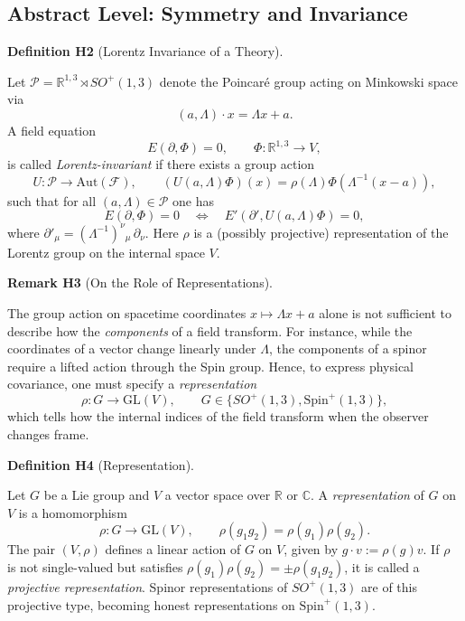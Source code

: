 \documentclass[10pt, letterpaper]{article}
\newcommand{\R}{\mathbb{R}}
\newcommand{\Aut}{\mathrm{Aut}}
\newcommand{\C}{\mathbb{C}}
\newcommand{\GL}{\mathrm{GL}}
\newcommand{\Spin}{\mathrm{Spin}}
\newcommand{\CustomHeading}[3]{%
  \par\medskip\noindent%
  \textbf{#1 #2} \textnormal{(#3)}.\enskip%
}
\newenvironment{DEF}[2]{\begin{unitbox}\CustomHeading{Definition}{#1}{#2}}{\end{unitbox}}
\newenvironment{REM}[2]{\begin{unitbox}\CustomHeading{Remark}{#1}{#2}}{\end{unitbox}}
\begin{document}
\subsection{Abstract Level: Symmetry and Invariance}

\begin{DEF}{H2}{Lorentz Invariance of a Theory}
Let $\mathcal{P} = \R^{1,3}\rtimes SO^+(1,3)$ denote the Poincaré group acting on Minkowski space via
\[
(a,\Lambda)\cdot x = \Lambda x + a.
\]
A field equation
\[
E(\partial,\Phi)=0,\qquad \Phi:\R^{1,3}\to V,
\]
is called \emph{Lorentz-invariant} if there exists a group action
\[
U:\mathcal{P}\to \Aut(\mathcal{F}),\qquad (U(a,\Lambda)\Phi)(x) = \rho(\Lambda)\Phi(\Lambda^{-1}(x-a)),
\]
such that for all $(a,\Lambda)\in\mathcal{P}$ one has
\[
E(\partial,\Phi)=0\quad \Longleftrightarrow\quad E'(\partial',U(a,\Lambda)\Phi)=0,
\]
where $\partial'_\mu = (\Lambda^{-1})^\nu{}_\mu\,\partial_\nu$.  
Here $\rho$ is a (possibly projective) representation of the Lorentz group on the internal space $V$.
\end{DEF}

\begin{REM}{H3}{On the Role of Representations}
The group action on spacetime coordinates $x\mapsto \Lambda x + a$ alone is not sufficient to describe how the \emph{components} of a field transform.  
For instance, while the coordinates of a vector change linearly under $\Lambda$, the components of a spinor require a lifted action through the Spin group.  
Hence, to express physical covariance, one must specify a \emph{representation}
\[
\rho:G\to \GL(V),\qquad G\in\{SO^+(1,3),\Spin^+(1,3)\},
\]
which tells how the internal indices of the field transform when the observer changes frame.
\end{REM}

\begin{DEF}{H4}{Representation}
Let $G$ be a Lie group and $V$ a vector space over $\R$ or $\C$.  
A \emph{representation} of $G$ on $V$ is a homomorphism
\[
\rho:G\longrightarrow \GL(V),\qquad \rho(g_1 g_2)=\rho(g_1)\rho(g_2).
\]
The pair $(V,\rho)$ defines a linear action of $G$ on $V$, given by $g\cdot v:=\rho(g)v$.  
If $\rho$ is not single-valued but satisfies $\rho(g_1)\rho(g_2)=\pm\rho(g_1g_2)$, it is called a \emph{projective representation}.  
Spinor representations of $SO^+(1,3)$ are of this projective type, becoming honest representations on $\Spin^+(1,3)$.
\end{DEF}
\end{document}
